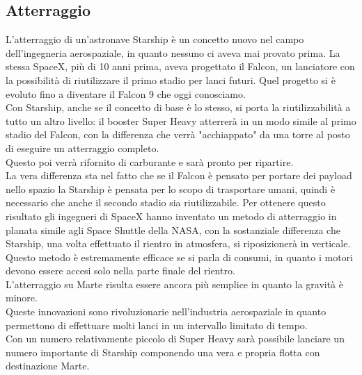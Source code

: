 \subsection{Atterraggio}
L'atterraggio di un'astronave Starship è un concetto nuovo nel campo dell'ingegneria aerospaziale, in quanto nessuno ci aveva mai provato prima. La stessa SpaceX, più di 10 anni prima, aveva progettato il Falcon, un lanciatore con la possibilità di riutilizzare il primo stadio per lanci futuri. Quel progetto si è evoluto fino a diventare il Falcon 9 che oggi conosciamo.\\
Con Starship, anche se il concetto di base è lo stesso, si porta la riutilizzabilità a tutto un altro livello: il booster Super Heavy atterrerà in un modo simile al primo stadio del Falcon, con la differenza che verrà "acchiappato" da una torre al posto di eseguire un atterraggio completo.\\
Questo poi verrà rifornito di carburante e sarà pronto per ripartire.\\
La vera differenza sta nel fatto che se il Falcon è pensato per portare dei payload nello spazio la Starship è pensata per lo scopo di trasportare umani, quindi è necessario che anche il secondo stadio sia riutilizzabile. Per ottenere questo risultato gli ingegneri di SpaceX hanno inventato un metodo di atterraggio in planata simile agli Space Shuttle della NASA, con la sostanziale differenza che Starship, una volta effettuato il rientro in atmosfera, si riposizionerà in verticale.\\
Questo metodo è estremamente efficace se si parla di consumi, in quanto i motori devono essere accesi solo nella parte finale del rientro. \\
L'atterraggio su Marte risulta essere ancora più semplice in quanto la gravità è minore.\\
Queste innovazioni sono rivoluzionarie nell'industria aerospaziale in quanto permettono di effettuare molti lanci in un intervallo limitato di tempo.\\
Con un numero relativamente piccolo di Super Heavy sarà possibile lanciare un numero importante di Starship componendo una vera e propria flotta con destinazione Marte.
